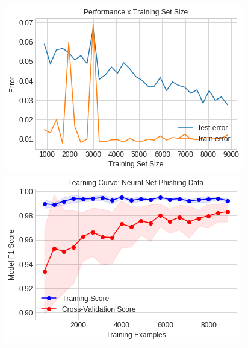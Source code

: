 \documentclass[11pt, a4paper]{article} %
\begin{document}
\newline\newline
\includegraphics[scale=0.55]{NN_LC.png}
\includegraphics[scale=0.55]{NN_Learning_Curve.png}
\end{document}
